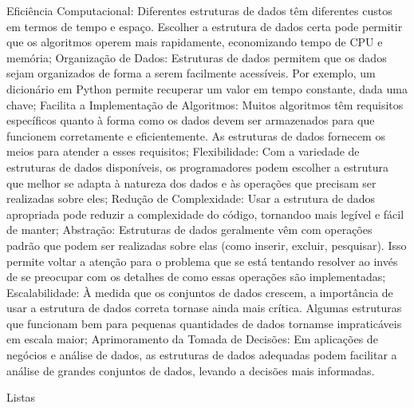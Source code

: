 \documentclass[letterpaper,10pt,english]{jupyterBook}
\begin{document}
\sphinxAtStartPar
Eficiência Computacional: Diferentes estruturas de dados têm diferentes custos em termos de tempo e espaço. Escolher a estrutura de dados certa pode permitir que os algoritmos operem mais rapidamente, economizando tempo de CPU e memória;
Organização de Dados: Estruturas de dados permitem que os dados sejam organizados de forma a serem facilmente acessíveis. Por exemplo, um dicionário em Python permite recuperar um valor em tempo constante, dada uma chave;
Facilita a Implementação de Algoritmos: Muitos algoritmos têm requisitos específicos quanto à forma como os dados devem ser armazenados para que funcionem corretamente e eficientemente. As estruturas de dados fornecem os meios para atender a esses requisitos;
Flexibilidade: Com a variedade de estruturas de dados disponíveis, os programadores podem escolher a estrutura que melhor se adapta à natureza dos dados e às operações que precisam ser realizadas sobre eles;
Redução de Complexidade: Usar a estrutura de dados apropriada pode reduzir a complexidade do código, tornando\sphinxhyphen{}o mais legível e fácil de manter;
Abstração: Estruturas de dados geralmente vêm com operações padrão que podem ser realizadas sobre elas (como inserir, excluir, pesquisar). Isso permite voltar a atenção para o problema que se está tentando resolver ao invés de se preocupar com os detalhes de como essas operações são implementadas;
Escalabilidade: À medida que os conjuntos de dados crescem, a importância de usar a estrutura de dados correta torna\sphinxhyphen{}se ainda mais crítica. Algumas estruturas que funcionam bem para pequenas quantidades de dados tornam\sphinxhyphen{}se impraticáveis em escala maior;
Aprimoramento da Tomada de Decisões: Em aplicações de negócios e análise de dados, as estruturas de dados adequadas podem facilitar a análise de grandes conjuntos de dados, levando a decisões mais informadas.

\sphinxAtStartPar
Listas
\end{document}
